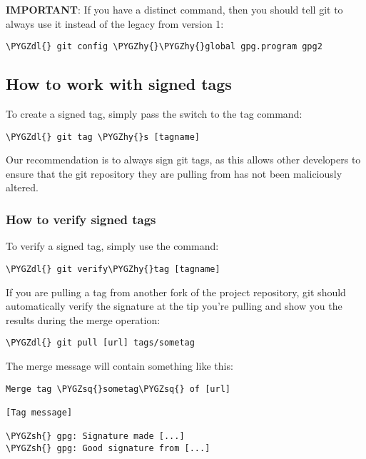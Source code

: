 \documentclass[a4paper,8pt,english]{sphinxmanual}
\def\PYGZsh{\char`\#}
\def\PYGZdl{\char`\$}
\def\PYGZhy{\char`\-}
\def\PYGZsq{\char`\'}
\renewcommand\PYGZsq{\textquotesingle}
\begin{document}
\textbf{IMPORTANT}: If you have a distinct  command, then you should
tell git to always use it instead of the legacy  from version 1:

\begin{Verbatim}[commandchars=\\\{\}]
\PYGZdl{} git config \PYGZhy{}\PYGZhy{}global gpg.program gpg2
\end{Verbatim}


\subsection{How to work with signed tags}
\label{process/maintainer-pgp-guide:how-to-work-with-signed-tags}
To create a signed tag, simply pass the  switch to the tag
command:

\begin{Verbatim}[commandchars=\\\{\}]
\PYGZdl{} git tag \PYGZhy{}s [tagname]
\end{Verbatim}

Our recommendation is to always sign git tags, as this allows other
developers to ensure that the git repository they are pulling from has
not been maliciously altered.


\subsubsection{How to verify signed tags}
\label{process/maintainer-pgp-guide:how-to-verify-signed-tags}
To verify a signed tag, simply use the  command:

\begin{Verbatim}[commandchars=\\\{\}]
\PYGZdl{} git verify\PYGZhy{}tag [tagname]
\end{Verbatim}

If you are pulling a tag from another fork of the project repository,
git should automatically verify the signature at the tip you're pulling
and show you the results during the merge operation:

\begin{Verbatim}[commandchars=\\\{\}]
\PYGZdl{} git pull [url] tags/sometag
\end{Verbatim}

The merge message will contain something like this:

\begin{Verbatim}[commandchars=\\\{\}]
Merge tag \PYGZsq{}sometag\PYGZsq{} of [url]

[Tag message]

\PYGZsh{} gpg: Signature made [...]
\PYGZsh{} gpg: Good signature from [...]
\end{Verbatim}
\end{document}

